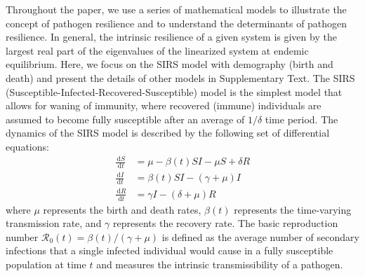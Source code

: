 \documentclass[12pt]{article}
\newcommand{\dd}[1]{\ensuremath{\, \mathrm{d}#1}}
\begin{document}
Throughout the paper, we use a series of mathematical models to illustrate the concept of pathogen resilience and to understand the determinants of pathogen resilience.
In general, the intrinsic resilience of a given system is given by the largest real part of the eigenvalues of the linearized system at endemic equilibrium.
Here, we focus on the SIRS model with demography (birth and death) and present the details of other models in Supplementary Text.
The SIRS (Susceptible-Infected-Recovered-Susceptible) model is the simplest model that allows for waning of immunity, where recovered (immune) individuals are assumed to become fully susceptible after an average of $1/\delta$ time period.
The dynamics of the SIRS model is described by the following set of differential equations:
\begin{align}
\frac{\dd S}{\dd t} &= \mu - \beta(t) SI - \mu S + \delta R \\
\frac{\dd I}{\dd t} &= \beta(t) SI - (\gamma + \mu) I \\
\frac{\dd R}{\dd t} &= \gamma I - (\delta + \mu) R
\end{align}
where $\mu$ represents the birth and death rates, $\beta(t)$ represents the time-varying transmission rate, and $\gamma$ represents the recovery rate.
The basic reproduction number $\mathcal R_0(t) = \beta(t)/(\gamma + \mu)$ is defined as the average number of secondary infections that a single infected individual would cause in a fully susceptible population at time $t$ and measures the intrinsic transmissibility of a pathogen.
\end{document}
